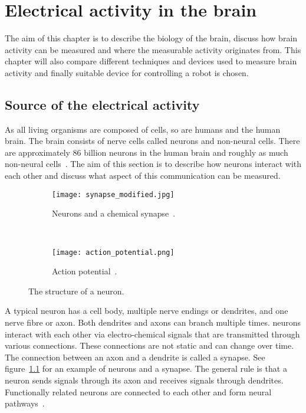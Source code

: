 
\chapter{Electrical activity in the brain}

The aim of this chapter is to describe the biology of the brain, discuss how brain activity can be measured and where the measurable activity originates from. This chapter will also compare different techniques and devices used to measure brain activity and finally suitable device for controlling a robot is chosen.

\section{Source of the electrical activity}
\label{sec:neuron}

As all living organisms are composed of cells, so are humans and the human brain. The brain consists of nerve cells called \glspl{neuron} and non-neural cells. There are approximately 86 billion \glspl{neuron} in the human brain and roughly as much non-neural cells~\cite{neuroncount}. The aim of this section is to describe how \glspl{neuron} interact with each other and discuss what aspect of this communication can be measured.

\begin{figure}[b!]
	\centering
	\begin{subfigure}{0.48\textwidth}
		\texttt{[image: synapse\_modified.jpg]}
		\caption{Neurons and a chemical synapse~\cite[p.~17]{neuronpic}.}
		\label{fig:neuron_synapse}
	\end{subfigure}
	~
	\begin{subfigure}{0.48\textwidth}
		\texttt{[image: action\_potential.png]}
		\caption{Action potential~\cite{action_potential_pic}.}
		\label{fig:action_potential}
	\end{subfigure}
	\caption{The structure of a neuron.}
\end{figure}

A typical \gls{neuron} has a cell body, multiple nerve endings or \glspl{dendrite}, and one nerve fibre or \gls{axon}. Both \glspl{dendrite} and \glspl{axon} can branch multiple times. \Glspl{neuron} interact with each other via electro-chemical signals that are transmitted through various connections. These connections are not static and can change over time. The connection between an \gls{axon} and a \gls{dendrite} is called a \gls{synapse}. See figure~\ref{fig:neuron_synapse} for an example of \glspl{neuron} and a \gls{synapse}. The general rule is that a \gls{neuron} sends signals through its \gls{axon} and receives signals through \glspl{dendrite}. Functionally related \glspl{neuron} are connected to each other and form \glspl{neural pathway}~\cite{neuralpathway}.

